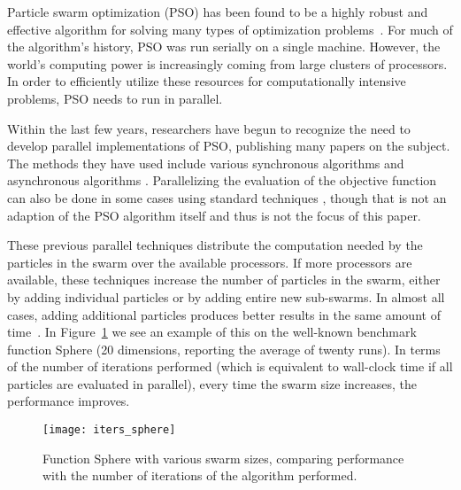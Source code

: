 \documentclass[smallcondensed]{svjour3}
\newcommand{\fig}[1]{Figure~\ref{fig:#1}}
\begin{document}
Particle swarm optimization (PSO) has been found to be a highly robust and
effective algorithm for solving many types of optimization
problems~\citep{poli-2008-pso-applications}.  For much of the algorithm's
history, PSO was run serially on a single machine.  However, the world's
computing power is increasingly coming from large clusters of processors.  In
order to efficiently utilize these resources for computationally intensive
problems, PSO needs to run in parallel.

Within the last few years, researchers have begun to recognize the need to
develop parallel implementations of PSO, publishing many papers on the subject.
The methods they have used include various synchronous algorithms
\citep{parsopoulos-2004-parallel-vector-evaluated-pso} and asynchronous
algorithms \citep{mostaghim-2006-multi-objective-pso-on-grids}.  Parallelizing
the evaluation of the objective function can also be done in some cases using
standard techniques \citep{grama-2003-intro-to-parallel-computing}, though that
is not an adaption of the PSO algorithm itself and thus is not the focus of
this paper.

These previous parallel techniques distribute the computation needed by the
particles in the swarm over the available processors.  If more processors are
available, these techniques increase the number of particles in the swarm,
either by adding individual particles or by adding entire new sub-swarms.  In
almost all cases, adding additional particles produces better results in the
same amount of time~\citep{mcnabb-2009-large-particle-swarms}.  In
\fig{iters-sphere} we see an example of this on the well-known benchmark
function Sphere (20 dimensions, reporting the average of twenty runs).  In
terms of the number of iterations performed (which is equivalent to wall-clock
time if all particles are evaluated in parallel), every time the swarm size
increases, the performance improves.

\begin{figure}
  \centering
  \texttt{[image: iters\_sphere]}
  \caption{Function Sphere with various swarm sizes, comparing performance with
  the number of iterations of the algorithm performed.}
  \label{fig:iters-sphere}
\end{figure}
\end{document}
